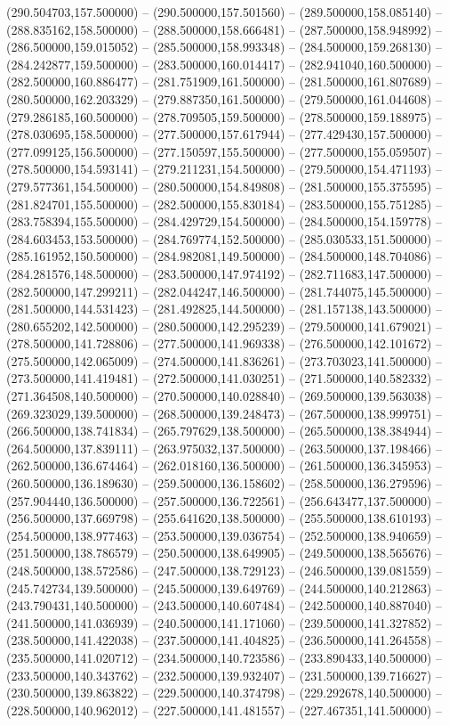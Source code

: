 (290.504703,157.500000) -- (290.500000,157.501560) -- (289.500000,158.085140) -- (288.835162,158.500000) -- (288.500000,158.666481) -- (287.500000,158.948992) -- (286.500000,159.015052) -- (285.500000,158.993348) -- (284.500000,159.268130) -- (284.242877,159.500000) -- (283.500000,160.014417) -- (282.941040,160.500000) -- (282.500000,160.886477) -- (281.751909,161.500000) -- (281.500000,161.807689) -- (280.500000,162.203329) -- (279.887350,161.500000) -- (279.500000,161.044608) -- (279.286185,160.500000) -- (278.709505,159.500000) -- (278.500000,159.188975) -- (278.030695,158.500000) -- (277.500000,157.617944) -- (277.429430,157.500000) -- (277.099125,156.500000) -- (277.150597,155.500000) -- (277.500000,155.059507) -- (278.500000,154.593141) -- (279.211231,154.500000) -- (279.500000,154.471193) -- (279.577361,154.500000) -- (280.500000,154.849808) -- (281.500000,155.375595) -- (281.824701,155.500000) -- (282.500000,155.830184) -- (283.500000,155.751285) -- (283.758394,155.500000) -- (284.429729,154.500000) -- (284.500000,154.159778) -- (284.603453,153.500000) -- (284.769774,152.500000) -- (285.030533,151.500000) -- (285.161952,150.500000) -- (284.982081,149.500000) -- (284.500000,148.704086) -- (284.281576,148.500000) -- (283.500000,147.974192) -- (282.711683,147.500000) -- (282.500000,147.299211) -- (282.044247,146.500000) -- (281.744075,145.500000) -- (281.500000,144.531423) -- (281.492825,144.500000) -- (281.157138,143.500000) -- (280.655202,142.500000) -- (280.500000,142.295239) -- (279.500000,141.679021) -- (278.500000,141.728806) -- (277.500000,141.969338) -- (276.500000,142.101672) -- (275.500000,142.065009) -- (274.500000,141.836261) -- (273.703023,141.500000) -- (273.500000,141.419481) -- (272.500000,141.030251) -- (271.500000,140.582332) -- (271.364508,140.500000) -- (270.500000,140.028840) -- (269.500000,139.563038) -- (269.323029,139.500000) -- (268.500000,139.248473) -- (267.500000,138.999751) -- (266.500000,138.741834) -- (265.797629,138.500000) -- (265.500000,138.384944) -- (264.500000,137.839111) -- (263.975032,137.500000) -- (263.500000,137.198466) -- (262.500000,136.674464) -- (262.018160,136.500000) -- (261.500000,136.345953) -- (260.500000,136.189630) -- (259.500000,136.158602) -- (258.500000,136.279596) -- (257.904440,136.500000) -- (257.500000,136.722561) -- (256.643477,137.500000) -- (256.500000,137.669798) -- (255.641620,138.500000) -- (255.500000,138.610193) -- (254.500000,138.977463) -- (253.500000,139.036754) -- (252.500000,138.940659) -- (251.500000,138.786579) -- (250.500000,138.649905) -- (249.500000,138.565676) -- (248.500000,138.572586) -- (247.500000,138.729123) -- (246.500000,139.081559) -- (245.742734,139.500000) -- (245.500000,139.649769) -- (244.500000,140.212863) -- (243.790431,140.500000) -- (243.500000,140.607484) -- (242.500000,140.887040) -- (241.500000,141.036939) -- (240.500000,141.171060) -- (239.500000,141.327852) -- (238.500000,141.422038) -- (237.500000,141.404825) -- (236.500000,141.264558) -- (235.500000,141.020712) -- (234.500000,140.723586) -- (233.890433,140.500000) -- (233.500000,140.343762) -- (232.500000,139.932407) -- (231.500000,139.716627) -- (230.500000,139.863822) -- (229.500000,140.374798) -- (229.292678,140.500000) -- (228.500000,140.962012) -- (227.500000,141.481557) -- (227.467351,141.500000) -- 